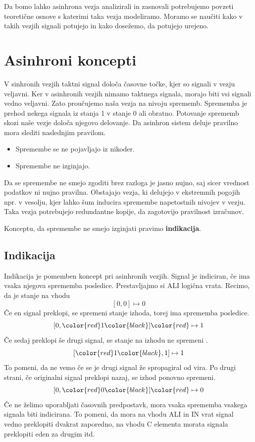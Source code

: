 
Da bomo lahko asinhrona vezja analizirali in zasnovali potrebujemo povzeti teoretične osnove s katerimi taka vezja modeliramo. Moramo se naučiti kako v takih vezjih signali potujejo in kako dosežemo, da potujejo urejeno. 


\section{Asinhroni koncepti} \label{a}
V sinhronih vezjih taktni signal določa časovne točke, kjer so signali v vezju veljavni. Ker v asinhronih vezjih nimamo taktnega signala, morajo biti vsi signali vedno veljavni. Zato proučujemo naša vezja na nivoju sprememb.
Sprememba je prehod nekega signala iz stanja 1 v stanje 0 ali obratno. Potovanje sprememb skozi naše vezje določa njegovo delovanje. Da asinhron sistem deluje pravilno mora slediti naslednjim pravilom.

\begin{itemize}
	\item Spremembe se ne pojavljajo iz nikoder.
	\item Spremembe ne izginjajo.
\end{itemize}

Da se spremembe ne smejo zgoditi brez razloga je jasno nujno, saj sicer vrednost podatkov ni nujno pravilna. Obstajajo vezja, ki delujejo v ekstremnih pogojih npr. v vesolju, kjer lahko šum inducira spremembe napetostnih nivojev v vezju. Taka vezja potrebujejo redundantne kopije, da zagotovijo pravilnost izračunov.

Konceptu, da spremembe ne smejo izginjati pravimo \textbf{indikacija}.

\subsection{Indikacija} \label{b}

Indikacija je pomemben koncept pri asinhronih vezjih. Signal je indiciran, če ima vsaka njegova sprememba posledice. Prestavljajmo si ALI logična vrata. Recimo, da je stanje na vhodu
\[[0,0] \mapsto 0\]
Če en signal preklopi, se spremeni stanje izhoda, torej ima sprememba posledice.
\[[0,\color{red}1\color{black}] \color{red}\mapsto 1\]
Če sedaj preklopi še drugi signal, se stanje na izhodu ne spremeni .
\[[\color{red}1\color{black},1] \mapsto 1\]
To pomeni, da ne vemo če se je drugi signal že spropagiral od vira. Po drugi strani, če originalni signal preklopi nazaj, se izhod ponovno spremeni.
\[[0,\color{red}0\color{black}] \color{red}\mapsto 0\]
Če ne želimo uporabljati časovnih predpostavk, mora vsaka sprememba vsakega signala biti indicirana. To pomeni, da mora na vhodu ALI in IN vrat signal vedno preklopiti dvakrat zaporedno, na vhodu C elementa morata signala preklopiti eden za drugim itd. 

